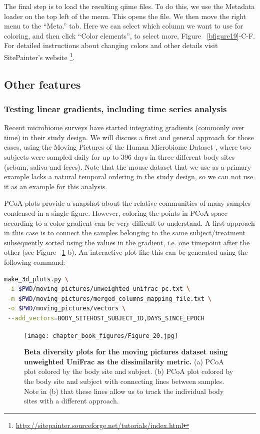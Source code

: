 The final step is to load the resulting \gls{qiime} files. To do this, we use the Metadata loader
on the top left of the menu. This opens the file. We then move the right menu to the “Meta.”
tab. Here we can select which column we want to use for coloring, and then click “Color elements”,
to select more, Figure ~\ref{bfigure19}-C-F. For detailed instructions about changing colors and
other details visit SitePainter's website \footnote{\url{http://sitepainter.sourceforge.net/tutorials/index.html}}.

\subsection{Other features}
\subsubsection{Testing linear gradients, including time series analysis}

Recent microbiome surveys have started integrating gradients (commonly over time) in their study design.
We will discuss a first and general approach for those cases, using the Moving Pictures of the Human
Microbiome Dataset \cite{Caporaso2011}, where two subjects were sampled daily for up to 396 days in three
different body sites (sebum, saliva and feces). Note that the mouse dataset that we use as a primary example
lacks a natural temporal ordering in the study design, so we can not use it as an example for this analysis.

PCoA plots provide a snapshot about the relative communities of many samples condensed in a single figure.
However, coloring the points in PCoA space according to a color gradient can be very difficult to understand.
A first approach in this case is to connect the samples belonging to the same subject/treatment subsequently
sorted using the values in the gradient, i.e. one timepoint after the other (see Figure ~\ref{bfigure20} b).
An interactive plot like this can be generated using the following command:

\begin{lstlisting}[language=bash]
make_3d_plots.py \
 -i $PWD/moving_pictures/unweighted_unifrac_pc.txt \
 -m $PWD/moving_pictures/merged_columns_mapping_file.txt \
 -o $PWD/moving_pictures/vectors \
 --add_vectors=BODY_SITEHOST_SUBJECT_ID,DAYS_SINCE_EPOCH
\end{lstlisting}

\begin{figure}[htbp]
\texttt{[image: chapter\_book\_figures/Figure\_20.jpg]}
\caption[Beta diversity plots for the moving pictures dataset using unweighted UniFrac as the dissimilarity metric]{\textbf{Beta diversity plots for the moving pictures dataset using unweighted UniFrac as the dissimilarity metric.}
(a) PCoA plot colored by the body site and subject. (b) PCoA plot colored by the body
site and subject with connecting lines between samples. Note in (b) that these lines
allow us to track the individual body sites with a different approach.}
\label{bfigure20}
\end{figure}

